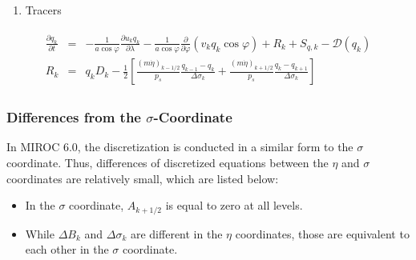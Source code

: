 \begin{enumerate}
\def\labelenumi{\arabic{enumi}.}
\tightlist
\item
  Tracers
\end{enumerate}

\begin{eqnarray}\begin{aligned}
  \frac{\partial q_k}{\partial t}
      &=&   - \frac{1}{a\cos\varphi}
               \frac{\partial u_k q_k}{\partial \lambda}
          - \frac{1}{a\cos\varphi}
               \frac{\partial }{\partial \varphi} ( v_k q_k\cos\varphi)
          + R_k
          + S_{q,k}
          - {\mathcal D}(q_k) \\
R_k  &=&  q_k D_k
       - \frac{1}{2}
             \left[   \frac{(m\dot{\eta})_{k-1/2}}{p_s} \frac{q_{k-1} - q_k}{\Delta\sigma_k}
               + \frac{(m\dot{\eta})_{k+1/2}}{p_s} \frac{q_k   - q_{k+1}}{\Delta\sigma_k} \right]\end{aligned}\end{eqnarray}

\hypertarget{differences-from-the-sigma-coordinate}{%
\subsubsection{\texorpdfstring{Differences from the \(\sigma\)-Coordinate}{Differences from the \textbackslash sigma-Coordinate}}\label{differences-from-the-sigma-coordinate}}

In MIROC 6.0, the discretization is conducted in a similar form to the \(\sigma\) coordinate. Thus, differences of discretized equations between the \(\eta\) and \(\sigma\) coordinates are relatively
small, which are listed below:

\begin{itemize}
\item
  In the \(\sigma\) coordinate, \(A_{k+1/2}\) is equal to zero at all levels.
\item
  While \(\Delta B_k\) and \(\Delta \sigma_k\) are different in the \(\eta\) coordinates, those are equivalent to each other in the \(\sigma\) coordinate.
\end{itemize}
